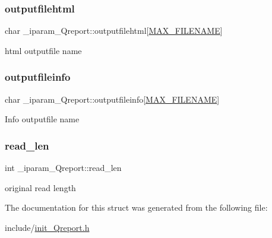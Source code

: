 \subsubsection{\texorpdfstring{outputfilehtml}{outputfilehtml}}
{\footnotesize\ttfamily char \+\_\+iparam\+\_\+\+Qreport\+::outputfilehtml\mbox{[}\mbox{\hyperlink{defines_8h_abe0ec333b60117063f9b9fd9f849cb08}{M\+A\+X\+\_\+\+F\+I\+L\+E\+N\+A\+ME}}\mbox{]}}

html outputfile name \mbox{\label{struct__iparam__Qreport_a75f5c38f9365c0c1370040928f43d316}} 
\subsubsection{\texorpdfstring{outputfileinfo}{outputfileinfo}}
{\footnotesize\ttfamily char \+\_\+iparam\+\_\+\+Qreport\+::outputfileinfo\mbox{[}\mbox{\hyperlink{defines_8h_abe0ec333b60117063f9b9fd9f849cb08}{M\+A\+X\+\_\+\+F\+I\+L\+E\+N\+A\+ME}}\mbox{]}}

Info outputfile name \mbox{\label{struct__iparam__Qreport_a1004bab2a5776669710b74925ba4d338}} 
\subsubsection{\texorpdfstring{read\+\_\+len}{read\_len}}
{\footnotesize\ttfamily int \+\_\+iparam\+\_\+\+Qreport\+::read\+\_\+len}

original read length 

The documentation for this struct was generated from the following file\+:\begin{DoxyCompactItemize}
\item 
include/\mbox{\hyperlink{init__Qreport_8h}{init\+\_\+\+Qreport.\+h}}\end{DoxyCompactItemize}
